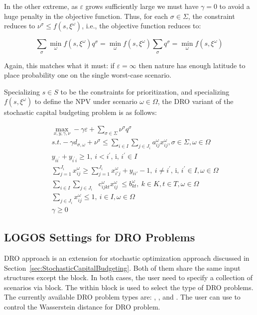 In the other extreme, as $\varepsilon$ grows sufficiently large we must have $\gamma = 0$
to avoid a huge penalty in the objective function. Thus, for each $\sigma \in \Sigma$,
the constraint reduces to $\nu^\sigma \le f(s, \xi^\omega)$, i.e.,
the objective function reduces to:

\begin{equation}
\sum_\sigma \min_\omega f(s, \xi^\omega) q^\sigma = \min_\omega f(s, \xi^\omega) \sum_\sigma q^\sigma = \min_\omega f(s, \xi^\omega)
\end{equation}

Again, this matches what it must: if $\varepsilon = \infty$ then nature has enough latitude
to place probability one on the single worst-case scenario.

Specializing $s\in S$ to be the constraints for prioritization, and specializing
$f(s,\xi^\omega)$ to define the NPV under scenario $\omega\in \Omega$, the DRO variant of the
stochastic capital budgeting problem is as follows:

\begin{subequations}\label{fullDRO}
\begin{eqnarray}
& & \max_{x, y, \gamma, \nu} -\gamma \varepsilon + \sum_{\sigma\in \Sigma} \nu^\sigma q^\sigma \\
& & s.t. -\gamma d_{\sigma, \omega} + \nu^\sigma \le \sum _{i \in I}^{} \sum _{j \in J_{i}}^{}a_{ij}^{ \omega }x_{ij}^{ \omega }, \sigma \in \Sigma, \omega \in \Omega \\
& & y_{ii^{'}}+y_{i^{'}i} \geq 1,~ i<i^{'}\text{, i, }i^{'} \in I \\
& & \sum_{j=1}^{J_i} x_{ij}^\omega \geq \sum_{j=1}^{J_i} x_{i'j}^\omega + y_{ii'} -1,~ i \neq i^{'}\text{, i, }i^{'} \in I,  \omega  \in  \Omega \\
& & \sum _{i \in I}^{} \sum _{j \in J_{i}}^{}\text{~ c}_{ijkt}^{ \omega }x_{ij}^{ \omega }~  \leq  b_{kt}^{ \omega },~ k \in K, t \in T,  \omega  \in  \Omega \\
& & \sum_{j\in J_i} x_{ij}^{ \omega } \leq 1,~ i \in I, \omega  \in  \Omega \\
& & \gamma \ge 0
\end{eqnarray}
\end{subequations}

\subsection{LOGOS Settings for DRO Problems}
\label{DROSettings}
DRO approach is an extension for stochastic optimization approach discussed in
Section~\ref{sec:StochasticCapitalBudgeting}. Both of them share the same input
structures except the  block. In both cases, the user need to
specify a collection of scenarios via  block. The
 within  block is used to select the
type of DRO problems. The currently available DRO problem types are:
, , and . The user can
use  to control the Wasserstein distance for DRO problem.

